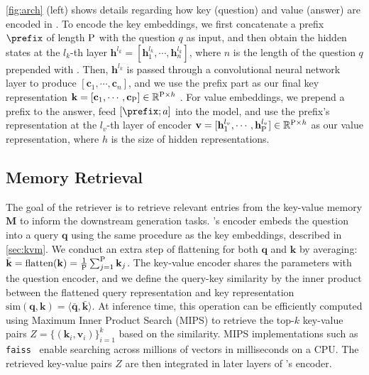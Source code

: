 \cref{fig:arch} (left) shows details regarding how key (question) and value (answer) are encoded in \ModelName.
To encode the key embeddings, we first concatenate a prefix $\prefix$ of length $\textup{P}$ with the question $q$ as input, and then obtain the hidden states at the $l_k$-th layer $\mathbf{h}^{l_k} = [\mathbf{h}_1^{l_k}, \cdots, \mathbf{h}_n^{l_k} ]$, where $n$ is the length of the question $q$ prepended with \prefix.
Then, $\mathbf{h}^{l_k}$ is passed through a convolutional neural network layer to produce $[\mathbf{c}_1, \cdots, \mathbf{c}_{n}]$, 
and we use the prefix part as our final key representation $\mathbf{k} =[\mathbf{c}_1, \cdots, \mathbf{c}_{\textup{P}}] \in \mathbb{R}^{\textup{P} \times h}$ .
For value embeddings, we prepend a prefix to the answer, feed $[\prefix; a]$ into the model,
and use the prefix's representation at the $l_v$-th layer of encoder $\mathbf{v} = [\mathbf{h}_1^{l_v}, \cdots, \mathbf{h}_{\textup{P}}^{l_v}] \in \mathbb{R}^{\textup{P} \times h}$ as our value representation, where $h$ is the size of hidden representations.




\subsection{Memory Retrieval} \label{sec:retriever}


The goal of the retriever is to retrieve relevant entries from the key-value memory $\mathbf{M}$ to inform the downstream generation tasks.
\ModelName's encoder embeds the question into a query $\mathbf{q}$ using the same procedure as the key embeddings, described in \cref{sec:kvm}.
We conduct an extra step of flattening for both $\mathbf{q}$ and $\mathbf{k}$ by averaging:   
$\bar{\mathbf{k}} = \text{flatten}(\mathbf{k}) = \frac{1}{\textup{P}} \sum_{j=1}^{\textup{P}} \mathbf{k}_{j}$.
The key-value encoder shares the parameters with the question encoder,
and we define the query-key similarity by the inner product between the flattened query representation and key representation $\text{sim}(\mathbf{q}, \mathbf{k}) = \langle \bar{\mathbf{q}}, \bar{\mathbf{k}} \rangle$.
At inference time, this operation can be efficiently computed using Maximum Inner Product Search (MIPS)
to retrieve the top-$k$ key-value pairs $Z = \{(\mathbf{k}_i, \mathbf{v}_i)\}_{i=1}^{k}$ based on the similarity.
MIPS implementations such as \texttt{faiss}~\citep{faiss} enable searching across millions of vectors in milliseconds on a CPU.
The retrieved key-value pairs $Z$ are then integrated in later layers of \ModelName's encoder.


